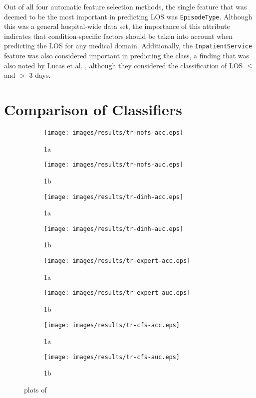 Out of all four automatic feature selection methods, the single feature that
was deemed to be the most important in predicting LOS was \texttt{EpisodeType}.
Although this was a general hospital-wide data set, the importance of this
attribute indicates that condition-specific factors should be taken into
account when predicting the LOS for any medical domain. Additionally, the
\texttt{InpatientService} feature was also considered important in predicting
the class, a finding that was also noted by Lucas et al. \cite{Lucas2009},
although they considered the classification of LOS $\leq$ and $>$ 3 days.

\section{Comparison of Classifiers}
\begin{figure}[htbp]
\begin{subfigure}{.48\textwidth}
\texttt{[image: images/results/tr-nofs-acc.eps]}
\caption{1a}
\label{}
\end{subfigure}%
\begin{subfigure}{.55\textwidth}
\texttt{[image: images/results/tr-nofs-auc.eps]}
\caption{1b}
\label{}
\end{subfigure}

\begin{subfigure}{.48\textwidth}
\texttt{[image: images/results/tr-dinh-acc.eps]}
\caption{1a}
\label{}
\end{subfigure}%
\begin{subfigure}{.55\textwidth}
\texttt{[image: images/results/tr-dinh-auc.eps]}
\caption{1b}
\label{}
\end{subfigure}

\begin{subfigure}{.48\textwidth}
\texttt{[image: images/results/tr-expert-acc.eps]}
\caption{1a}
\label{}
\end{subfigure}%
\begin{subfigure}{.55\textwidth}
\texttt{[image: images/results/tr-expert-auc.eps]}
\caption{1b}
\label{}
\end{subfigure}

\begin{subfigure}{.48\textwidth}
\texttt{[image: images/results/tr-cfs-acc.eps]}
\caption{1a}
\label{}
\end{subfigure}%
\begin{subfigure}{.55\textwidth}
\texttt{[image: images/results/tr-cfs-auc.eps]}
\caption{1b}
\label{}
\end{subfigure}
\caption{plots of}
\label{}
\end{figure}

